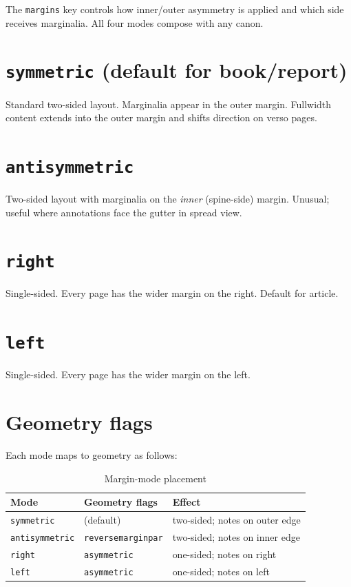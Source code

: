 \documentclass[11pt, twoside, openany]{book}
\newcommand{\pkg}[1]{\textsf{#1}}
\begin{document}
The \texttt{margins} key controls how inner/outer asymmetry is applied and which side receives marginalia. All four modes compose with any canon.

\section{\texttt{symmetric} (default for book/report)}\label{sec:symmetric}

Standard two-sided layout. Marginalia appear in the outer margin. Fullwidth content extends into the outer margin and shifts direction on verso pages.

\section{\texttt{antisymmetric}}\label{sec:antisymmetric}

Two-sided layout with marginalia on the \emph{inner} (spine-side) margin. Unusual; useful where annotations face the gutter in spread view.

\section{\texttt{right}}\label{sec:right}

Single-sided. Every page has the wider margin on the right. Default for \pkg{article}.

\section{\texttt{left}}\label{sec:left}

Single-sided. Every page has the wider margin on the left.

\section{Geometry flags}\label{sec:geometryflags}

Each mode maps to \pkg{geometry} as follows:

\begin{table}[h]
	\centering
	\caption{Margin-mode placement}
	\label{tab:marginplacement}
	\begin{tabular}{@{}lll@{}}
		\toprule
		\bfseries Mode         & \bfseries Geometry flags  & \bfseries Effect               \\
		\midrule
		\texttt{symmetric}     & (default)                 & two-sided; notes on outer edge \\
		\texttt{antisymmetric} & \texttt{reversemarginpar} & two-sided; notes on inner edge \\
		\texttt{right}         & \texttt{asymmetric}       & one-sided; notes on right      \\
		\texttt{left}          & \texttt{asymmetric}       & one-sided; notes on left       \\
		\bottomrule
	\end{tabular}
\end{table}
\end{document}
